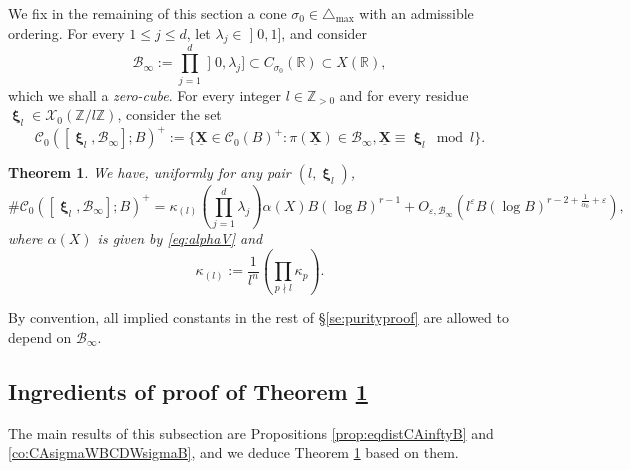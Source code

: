 \documentclass[11pt,letterpaper]{amsart}
\newcommand{\BR}{{\mathbb {R}}}
\newcommand{\BZ}{{\mathbb {Z}}}
\newcommand{\CB}{{\mathcal {B}}}
\newcommand{\CC}{{\mathcal {C}}}
\newcommand{\CX}{{\mathcal {X}}}
\newcommand{\XX}{\underline{\mathbf{X}}}
\DeclareMathOperator{\bxi}{\mathbf{\xi}}
\theoremstyle{plain}
\numberwithin{equation}{section}
\newtheorem{theorem}{Theorem}[section]
\theoremstyle{definition}
\theoremstyle{remark}
\begin{document}
 We fix in the remaining of this section a cone $\sigma_0\in\triangle_{\max}$ with an admissible ordering. 
 For every $1\leqslant j\leqslant d$, let $\lambda_j\in \mathopen]0,1\mathclose]$, and consider  \begin{equation}\label{eq:Binfty}
	\CB_\infty:=\prod_{j=1}^d \mathopen]0,\lambda_j\mathclose]\subset C_{\sigma_0}(\BR)\subset X(\BR),
\end{equation} which we shall a \emph{zero-cube}.
For every integer $l\in\BZ_{>0}$ and for every residue $\bxi_l\in\CX_0(\BZ/l\BZ)$,
consider the set \begin{equation}\label{eq:CC0xilVBinfty}
	\CC_0([\bxi_l,\CB_\infty];B)^+:=\{\XX\in\CC_0(B)^+: \pi(\XX)\in\CB_\infty,\XX\equiv \bxi_l\bmod l\}.
\end{equation}

\begin{theorem}\label{thm:equidistrcong}
	We have, uniformly for any pair $(l,\bxi_l)$,
	$$\#\CC_0([\bxi_l,\CB_\infty];B)^+=\kappa_{(l)}\left(\prod_{j=1}^{d}\lambda_{j}\right)\alpha(X)B(\log B)^{r-1}+O_{\varepsilon,\CB_\infty}(l^\varepsilon B(\log B)^{r-2+\frac{1}{\alpha_0}+\varepsilon}),$$ where $\alpha(X)$ is given by \eqref{eq:alphaV} and \begin{equation}\label{eq:kappal}
		\kappa_{(l)}:=\frac{1}{l^n}\left(\prod_{p\nmid l}\kappa_p\right).
	\end{equation} 
\end{theorem}
By convention, all implied constants in the rest of \S\ref{se:purityproof} are allowed to depend on $\CB_\infty$.
\subsection{Ingredients of proof of Theorem \ref{thm:equidistrcong}}\label{se:comparelatticepts}
The main results of this subsection are Propositions \ref{prop:eqdistCAinftyB} and \ref{co:CAsigmaWBCDWsigmaB}, and we deduce Theorem \ref{thm:equidistrcong} based on them.
\end{document}
